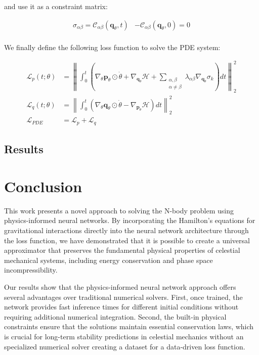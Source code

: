 \documentclass[draft]{agujournal2019}
\newcommand{\norm}[1]{\left\lVert#1\right\rVert}
\begin{document}
and use it as a constraint matrix:

\begin{align*}
    \sigma_{\alpha\beta} = \mathcal{C}_{\alpha\beta} \left(\mathbf{q}_\theta, t\right) &- \mathcal{C}_{\alpha\beta}\left(\mathbf{q}_\theta, 0\right) = 0 \\
\end{align*}

We finally define the following loss function to solve the PDE system:

\begin{align}
    \mathcal{L}_{p}(t; \theta) &= \norm{\int_0^t \left(\nabla_\theta \mathbf{p}_\theta \odot \dot{\theta} + \nabla_{\mathbf{q}_\theta} \mathcal{H} + \sum_{\substack{\alpha, \beta \\ \alpha \neq \beta}} \lambda_{\alpha\beta} \nabla_{\mathbf{q}_\theta} \sigma_k\right) dt}_2^2 \\
    \mathcal{L}_{q}(t; \theta) &= \norm{\int_0^t \left(\nabla_\theta \mathbf{q}_\theta \odot \dot{\theta} - \nabla_{\mathbf{p}_\theta} \mathcal{H}\right) dt}^2_2 \\
    \mathcal{L}_{PDE} &= \mathcal{L}_{p} + \mathcal{L}_{q}
\end{align}


\subsection{Results}

\section{Conclusion}
This work presents a novel approach to solving the N-body problem using physics-informed neural networks. By incorporating the Hamilton's equations for gravitational interactions directly into the neural network architecture through the loss function, we have demonstrated that it is possible to create a universal approximator that preserves the fundamental physical properties of celestial mechanical systems, including energy conservation and phase space incompressibility.

Our results show that the physics-informed neural network approach offers several advantages over traditional numerical solvers. First, once trained, the network provides fast inference times for different initial conditions without requiring additional numerical integration. Second, the built-in physical constraints ensure that the solutions maintain essential conservation laws, which is crucial for long-term stability predictions in celestial mechanics without an specialized numerical solver creating a dataset for a data-driven loss function.
\end{document}
